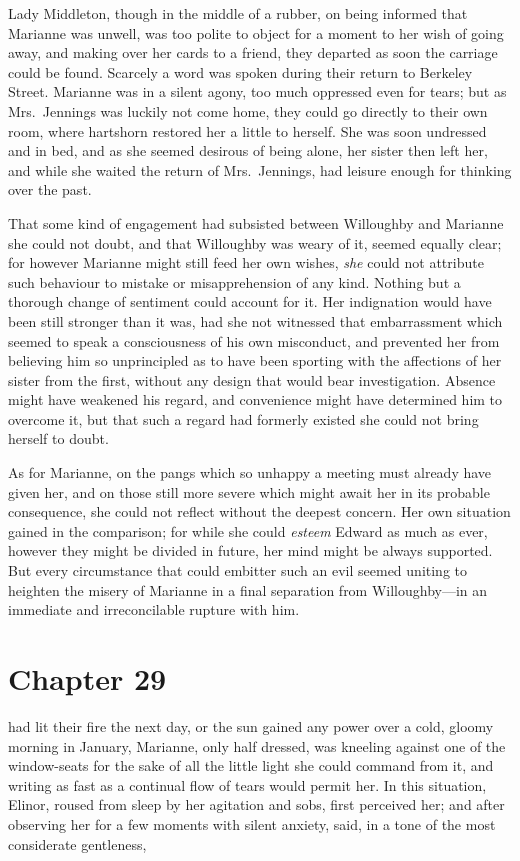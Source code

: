 Lady Middleton, though in the middle of a rubber,
on being informed that Marianne was unwell, was too
polite to object for a moment to her wish of going away,
and making over her cards to a friend, they departed
as soon the carriage could be found.  Scarcely a word
was spoken during their return to Berkeley Street.
Marianne was in a silent agony, too much oppressed even
for tears; but as Mrs.\ Jennings was luckily not come home,
they could go directly to their own room, where hartshorn
restored her a little to herself.  She was soon undressed
and in bed, and as she seemed desirous of being alone,
her sister then left her, and while she waited the return
of Mrs.\ Jennings, had leisure enough for thinking over
the past.

That some kind of engagement had subsisted
between Willoughby and Marianne she could not doubt,
and that Willoughby was weary of it, seemed equally clear;
for however Marianne might still feed her own wishes,
\emph{she} could not attribute such behaviour to mistake
or misapprehension of any kind.  Nothing but a thorough
change of sentiment could account for it.  Her indignation
would have been still stronger than it was, had she
not witnessed that embarrassment which seemed to speak
a consciousness of his own misconduct, and prevented
her from believing him so unprincipled as to have been
sporting with the affections of her sister from the first,
without any design that would bear investigation.
Absence might have weakened his regard, and convenience
might have determined him to overcome it, but that such
a regard had formerly existed she could not bring herself
to doubt.

As for Marianne, on the pangs which so unhappy a meeting
must already have given her, and on those still more
severe which might await her in its probable consequence,
she could not reflect without the deepest concern.
Her own situation gained in the comparison; for while she
could \emph{esteem} Edward as much as ever, however they might be
divided in future, her mind might be always supported.
But every circumstance that could embitter such an evil
seemed uniting to heighten the misery of Marianne
in a final separation from Willoughby---in an immediate
and irreconcilable rupture with him.



\chapter{Chapter 29}


 had lit their fire the next day,
or the sun gained any power over a cold, gloomy morning
in January, Marianne, only half dressed, was kneeling
against one of the window-seats for the sake of all
the little light she could command from it, and writing
as fast as a continual flow of tears would permit her.
In this situation, Elinor, roused from sleep by her agitation
and sobs, first perceived her; and after observing her
for a few moments with silent anxiety, said, in a tone
of the most considerate gentleness,

